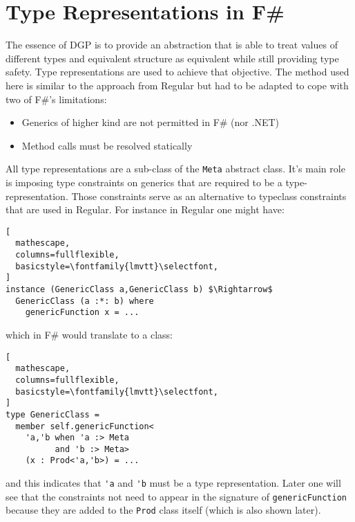 \documentclass{sigplanconf}
\begin{document}
\section{Type Representations in F\#}
The essence of DGP is to provide an abstraction that is able to treat
values of different types and equivalent structure as equivalent while
still providing type safety. Type representations are used to achieve
that objective. The method used here is similar to the approach from
Regular\cite{Regular} but had to be adapted to cope with two of F\#'s
limitations:
\begin{itemize}
\item Generics of higher kind are not permitted in F\# (nor .NET)
\item Method calls must be resolved statically
\end{itemize}
All type representations are a sub-class of the \verb+Meta+ abstract
class. It's main role is imposing type constraints on generics that
are required to be a type-representation. Those constraints serve as
an alternative to typeclass constraints that are used in Regular. For
instance in Regular one might have:
\begin{lstlisting}[
  mathescape,
  columns=fullflexible,
  basicstyle=\fontfamily{lmvtt}\selectfont,
]
instance (GenericClass a,GenericClass b) $\Rightarrow$
  GenericClass (a :*: b) where
    genericFunction x = ...
\end{lstlisting}
which in F\# would translate to a class:
\begin{lstlisting}[
  mathescape,
  columns=fullflexible,
  basicstyle=\fontfamily{lmvtt}\selectfont,
]
type GenericClass =
  member self.genericFunction<
    'a,'b when 'a :> Meta 
          and 'b :> Meta> 
    (x : Prod<'a,'b>) = ...
\end{lstlisting}
and this indicates that \verb+'a+ and \verb+'b+ must be a type
representation. Later one will see that the constraints not need to
appear in the signature of \verb+genericFunction+ because they are
added to the \verb+Prod+ class itself (which is also shown later).
\end{document}
